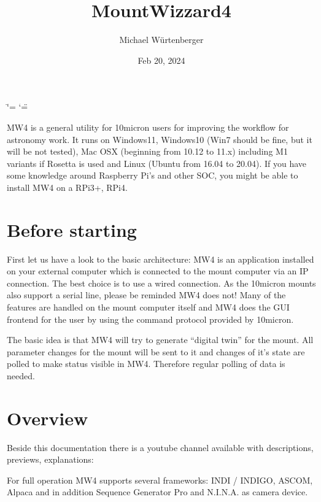 \documentclass[a4paper,10pt,english]{sphinxmanual}
\title{MountWizzard4}
\date{Feb 20, 2024}
\author{Michael Würtenberger}
\begin{document}
\ifdefined\shorthandoff
  \ifnum\catcode`\=\string=\active\shorthandoff{=}\fi
  \ifnum\catcode`\"=\active{}\fi
\fi

\pagestyle{empty}
\sphinxmaketitle
\pagestyle{plain}
\sphinxtableofcontents
\pagestyle{normal}
\label{\detokenize{index::doc}}


\sphinxAtStartPar
MW4 is a general utility for 10micron users for improving the workflow for astronomy
work. It runs on Windows11, Windows10 (Win7 should be fine, but it will be not
tested), Mac OSX (beginning from 10.12 to 11.x) including M1 variants if Rosetta is
used and Linux (Ubuntu from 16.04 to 20.04). If you have some knowledge around
Raspberry Pi’s and other SOC, you might be able to install MW4 on a RPi3+, RPi4.


\chapter{Before starting}
\label{\detokenize{index:before-starting}}
\sphinxAtStartPar
First let us have a look to the basic architecture: MW4 is an application
installed on your external computer which is connected to the mount computer via
an IP connection. The best choice is to use a wired connection. As the 10micron
mounts also support a serial line, please be reminded MW4 does not! Many of the
features are handled on the mount computer itself and MW4 does the GUI frontend
for the user by using the command protocol provided by 10micron.


\sphinxAtStartPar
The basic idea is that MW4 will try to generate “digital twin” for the mount. All
parameter changes for the mount will be sent to it and changes of it’s state are
polled to make status visible in MW4. Therefore regular polling of data is needed.


\chapter{Overview}
\label{\detokenize{index:overview}}
\sphinxAtStartPar
Beside this documentation there is a youtube channel available with descriptions,
previews, explanations:

\sphinxAtStartPar
{}

\sphinxAtStartPar
For full operation MW4 supports several frameworks: INDI / INDIGO, ASCOM, Alpaca
and in addition Sequence Generator Pro and N.I.N.A. as camera device.
\end{document}
